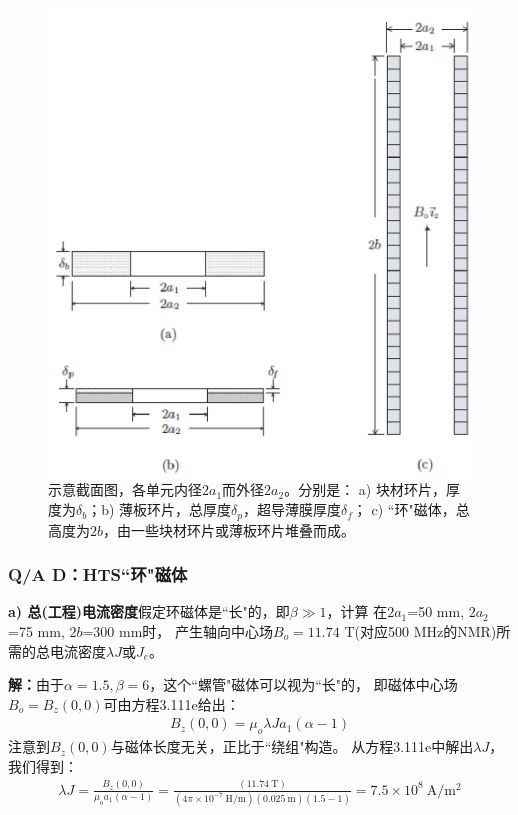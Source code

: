 \begin{figure}
	\centering
	\includegraphics[scale=0.7]{chpt9/figs/fig9.16.eps}
	\caption{示意截面图，各单元内径$2a_1$而外径$2a_2$。分别是：
		a) 块材环片，厚度为$\delta_b$；b) 薄板环片，总厚度$\delta_p$，超导薄膜厚度$\delta_f$；
		c) ``环"磁体，总高度为$2b$，由一些块材环片或薄板环片堆叠而成。}
\end{figure}

\subsubsection{Q/A D：HTS``环"磁体}
\textbf{a) 总(工程)电流密度}\qquad 假定环磁体是``长"的，即$\beta\gg 1$，计算
在$2a_1$=50 mm, $2a_2$=75 mm, $2b$=300 mm时，
产生轴向中心场$B_o=11.74$ T(对应500 MHz的NMR)所需的总电流密度$\lambda J$或$J_e$。

\textbf{解：}由于$\alpha=1.5,\beta=6$，这个``螺管"磁体可以视为``长"的，
即磁体中心场$B_o=B_z(0,0)$可由方程3.111e给出：
\begin{align*}%
B_z(0,0)=\mu_o\lambda Ja_1(\alpha-1) \tag{3.111e}
\end{align*}
注意到$B_z(0,0)$与磁体长度无关，正比于``绕组"构造。
从方程3.111e中解出$\lambda J$，我们得到：
\begin{align*}%
\lambda J=\frac{B_z(0,0)}{\mu_oa_1(\alpha-1)}=\frac{(11.74\ \mathrm{T})}{(4\pi\times 10^{-7}\ \mathrm{H/m})(0.025\ \mathrm{m})(1.5-1)}=7.5\times 10^8\ \mathrm{A/m^2}
\end{align*}

